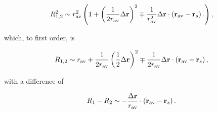 {\begin{dmath}\label{eqn:lecture11VectorDifference:130}
R_{1,2}^2 \sim
r_{\mathrm{av}}^2
\left(
1
+ \left(\inv{2 r_{\mathrm{av}}} \Delta \Br \right)^2
\mp \inv{r_{\mathrm{av}}^2} \Delta \Br \cdot \left(\Br_{\mathrm{av}} - \Br_s\right) .
\right),
\end{dmath}

which, to first order, is

\begin{dmath}\label{eqn:lecture11VectorDifference:150}
R_{1,2} \sim
r_{\mathrm{av}}
+ \inv{2 r_{\mathrm{av}}} \left(\inv{2} \Delta \Br \right)^2
\mp \inv{2 r_{\mathrm{av}}} \Delta \Br \cdot \left(\Br_{\mathrm{av}} - \Br_s\right),
\end{dmath}

with a difference of

\begin{dmath}\label{eqn:lecture11VectorDifference:170}
R_1 - R_2 \sim
-\frac{\Delta \Br}{r_{\mathrm{av}}} \cdot \left(\Br_{\mathrm{av}} - \Br_s\right).
\end{dmath}

} %
